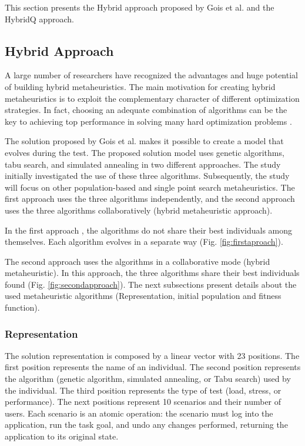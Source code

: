 \documentclass{bmcart}
\begin{document}
This section presents the Hybrid approach proposed by Gois et al.\citep{Gois2016} and the HybridQ approach.

\subsection{Hybrid Approach}

A large number of researchers have recognized the advantages and huge potential of building hybrid metaheuristics. The main motivation for creating hybrid metaheuristics is to exploit the complementary character of different optimization strategies. In fact, choosing an adequate combination of algorithms can be the key to achieving top performance in solving many hard optimization problems \citep{Puchinger2005} \citep{Blum2012}.

The solution proposed by Gois et al. \citep{Gois2016} makes it possible to create a model that evolves during the test. The proposed solution model uses genetic algorithms, tabu search, and simulated annealing in two different approaches. The study initially investigated the use of these three algorithms. Subsequently, the study will focus on other population-based and single point search metaheuristics. The first approach uses the three algorithms independently, and the second approach uses the three algorithms collaboratively (hybrid metaheuristic approach).

In the first approach , the algorithms do not share their best individuals among themselves. Each algorithm evolves in a separate way (Fig. \ref{fig:firstaproach}).





The second approach uses the algorithms in a collaborative mode (hybrid metaheuristic). In this approach, the three algorithms share their best individuals found (Fig. \ref{fig:secondapproach}). The next subsections present details about the used metaheuristic algorithms (Representation, initial population and fitness function).




\subsubsection{Representation}

The solution representation is composed by a linear vector with 23 positions. The first position represents the name of an individual. The second position represents the algorithm (genetic algorithm, simulated annealing, or Tabu search) used by the individual. The third position represents the type of test (load, stress, or performance). The next positions represent 10 scenarios and their number of users. Each scenario is an atomic operation: the scenario must log into the application, run the task goal, and undo any changes performed, returning the application to its original state.
\end{document}
